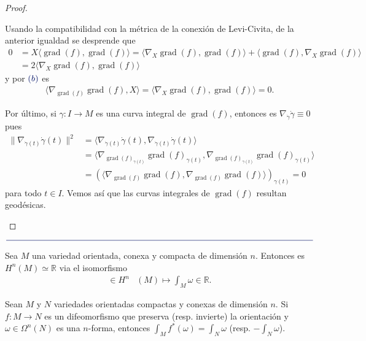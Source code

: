 \documentclass[11pt]{article}
\newcommand{\R}{\mathbb{R}}
\newcommand{\grad}{\operatorname{grad}}
\newcommand{\ip}[1]{\langle #1 \rangle}
\newcommand{\paint}[1]{\color{color}{#1}}
\newcommand{\paintline}{\begin{center}
$\paint{
\rule{400pt}{0.5pt}
}$
\vspace{10pt}
\end{center}}
\newenvironment{theorem}[2][Teorema]{\begin{trivlist}
\item[\hskip \labelsep \paint{{\bfseries #1}}\hskip \labelsep {\bfseries #2.}]}{\end{trivlist}}
\begin{document}
\begin{proof}
\begin{itemize}[listparindent = \parindent]
Usando la compatibilidad con la métrica de la conexión de Levi-Civita, de la anterior igualdad se desprende que 
\begin{align*}
0 &= X \ip{\grad(f),\grad(f)} = \ip{\nabla_X\grad(f),\grad(f)} + \ip{\grad(f),\nabla_X\grad(f)}\\
&= 2\ip{\nabla_X\grad(f),\grad(f)}
\end{align*}
y por $\paint{(b)}$ es
\begin{align*}
\ip{\nabla_{\grad(f)}\grad(f),X} = \ip{\nabla_X\grad(f),\grad(f)} = 0.
\end{align*}

Por último, si $\gamma : I \to M$ es una curva integral de $\grad(f)$, entonces es $\nabla_{\dot{\gamma}}\dot{\gamma} \equiv 0$  pues
\begin{align*}
\|\nabla_{\dot{\gamma}(t)}\dot{\gamma}(t)\|^2 &= \ip{\nabla_{\dot{\gamma}(t)}\dot{\gamma}(t),\nabla_{\dot{\gamma}(t)}\dot{\gamma}(t)}\\
& = \ip{\nabla_{\grad(f)_{\gamma(t)}}\grad(f)_{\gamma(t)},\nabla_{\grad(f)_{\gamma(t)}}\grad(f)_{\gamma(t)}}\\
& = (\ip{\nabla_{\grad(f)}\grad(f),\nabla_{\grad(f)}\grad(f)})_{\gamma(t)} = 0
\end{align*}
para todo $t \in I$. Vemos así que las curvas integrales de $\grad(f)$ resultan geodésicas.
\end{itemize}
\end{proof}

\paintline

\begin{tcolorbox}
\begin{theorem}{1} Sea $M$ una variedad orientada, conexa y compacta de dimensión $n$. Entonces es $H^n(M) \simeq \R$ via el isomorfismo
\begin{align*}
[\omega] \in H^n&(M) \longmapsto \int_M \omega \in \R.
\end{align*}
\end{theorem}
\end{tcolorbox}

\begin{tcolorbox}
\begin{theorem}{2} Sean $M$ y $N$ variedades orientadas compactas y conexas de dimensión $n$. Si $f : M \to N$ es un difeomorfismo que preserva (resp. invierte) la orientación y $\omega \in \Omega^n(N)$ es una $n$-forma, entonces $\int_M f^*(\omega) = \int_N \omega$ (resp. $-\int_N \omega$). 
\end{theorem}
\end{tcolorbox}
\end{document}
